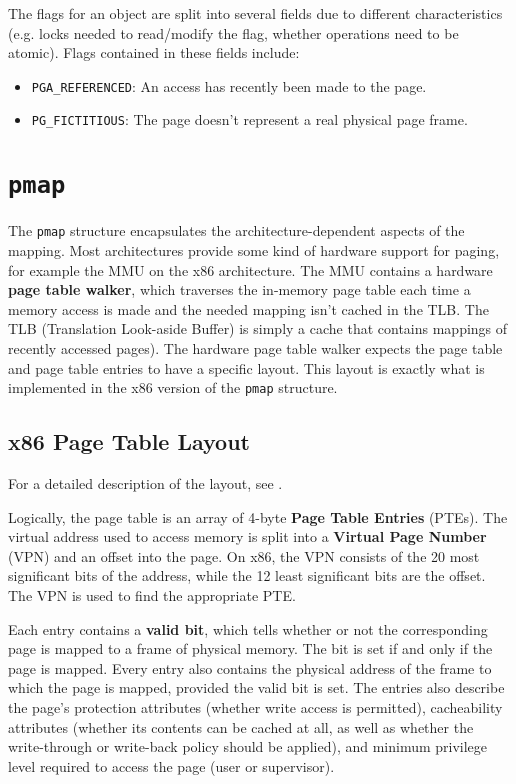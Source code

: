 \documentclass[shortabstract, english]{iithesis}
\begin{document}
The flags for an object are split into several fields due to different
characteristics (e.g. locks needed to read/modify the flag, whether operations
need to be atomic). Flags contained in these fields include:

\begin{itemize}
\item \texttt{PGA_REFERENCED}: An access has recently been made to the
  page.
\item \texttt{PG_FICTITIOUS}: The page doesn't represent a real physical
  page frame.
\end{itemize}


\section{\texttt{pmap}}

The \texttt{pmap} structure encapsulates the architecture-dependent
aspects of the mapping. Most architectures provide some kind of hardware support
for paging, for example the MMU on the x86 architecture. The MMU contains a
hardware \textbf{page table walker}, which traverses the in-memory page table
each time a memory access is made and the needed mapping isn't cached in the
TLB. The TLB (Translation Look-aside Buffer) is simply a cache that contains
mappings of recently accessed pages). The hardware page table walker expects the
page table and page table entries to have a specific layout. This layout is
exactly what is implemented in the x86 version of the \texttt{pmap}
structure.

\subsection{x86 Page Table Layout}

For a detailed description of the layout, see \cite[Section~4.2]{bib:intel}.

Logically, the page table is an array of 4-byte \textbf{Page Table Entries}
(PTEs). The virtual address used to access memory is split into a
\textbf{Virtual Page Number} (VPN) and an offset into the page. On x86, the VPN
consists of the 20 most significant bits of the address, while the 12 least
significant bits are the offset. The VPN is used to find the appropriate PTE.

Each entry contains a \textbf{valid bit}, which tells whether or not the
corresponding page is mapped to a frame of physical memory. The bit is set if
and only if the page is mapped. Every entry also contains the physical address
of the frame to which the page is mapped, provided the valid bit is set. The
entries also describe the page's protection attributes (whether write access is
permitted), cacheability attributes (whether its contents can be cached at all,
as well as whether the write-through or write-back policy should be applied),
and minimum privilege level required to access the page (user or supervisor).
\end{document}
